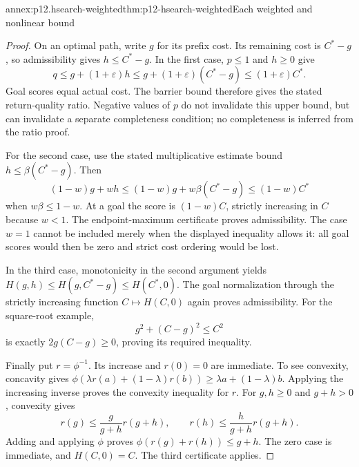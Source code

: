 \begin{annexitem}{annex:p12.hsearch-weighted}{thm:p12-hsearch-weighted}{Each weighted and nonlinear bound}
\begin{proof}
On an optimal path, write \(g\) for its prefix cost. Its remaining
cost is \(C^*-g\), so admissibility gives \(h\le C^*-g\).
In the first case, \(p\le 1\) and \(h\ge 0\) give
\[
 q\le g+(1+\varepsilon)h
 \le g+(1+\varepsilon)(C^*-g)
 \le(1+\varepsilon)C^*.
\]
Goal scores equal actual cost. The barrier bound therefore gives the
stated return-quality ratio. Negative values of \(p\) do not
invalidate this upper bound, but can invalidate a separate completeness
condition; no completeness is inferred from the ratio proof.

For the second case, use the stated multiplicative estimate bound
\(h\le\beta(C^*-g)\). Then
\[
 (1-w)g+wh\le(1-w)g+w\beta(C^*-g)
 \le(1-w)C^*
\]
when \(w\beta\le 1-w\). At a goal the score is
\((1-w)C\), strictly increasing in \(C\) because \(w<1\).
The endpoint-maximum certificate proves admissibility. The case \(w=1\)
cannot be included merely when the displayed inequality allows it:
all goal scores would then be zero and strict cost ordering would be lost.

In the third case, monotonicity in the second argument yields
\(H(g,h)\le H(g,C^*-g)\le H(C^*,0)\). The goal normalization
through the strictly increasing function \(C\mapsto H(C,0)\)
again proves admissibility. For the square-root example,
\[
 g^2+(C-g)^2\le C^2
\]
is exactly \(2g(C-g)\ge 0\), proving its required inequality.

Finally put \(r=\phi^{-1}\). Its increase and \(r(0)=0\) are
immediate. To see convexity, concavity gives
\(\phi(\lambda r(a)+(1-\lambda)r(b))\ge\lambda a+(1-\lambda)b\).
Applying the increasing inverse proves the convexity inequality for
\(r\). For \(g,h\ge 0\)
and \(g+h>0\), convexity gives
\[
 r(g)\le\frac{g}{g+h}r(g+h),\qquad
 r(h)\le\frac{h}{g+h}r(g+h).
\]
Adding and applying \(\phi\) proves
\(\phi(r(g)+r(h))\le g+h\). The zero case is immediate,
and \(H(C,0)=C\). The third certificate applies.
\end{proof}
\end{annexitem}

